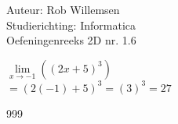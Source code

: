 \documentclass[a4paper]{article}
\begin{document}
\noindent \large Auteur: Rob Willemsen \\
\noindent \large Studierichting: Informatica\\
\noindent \large Oefeningenreeks 2D nr. 1.6\\

\medskip

\normalsize

$\lim\limits_{x \rightarrow -1} ((2x + 5)^3)$ \\ 

$= (2(-1) + 5)^3 = (3)^3 = 27$ \\

\begin{thebibliography}{999}
\end{thebibliography}
\end{document}
